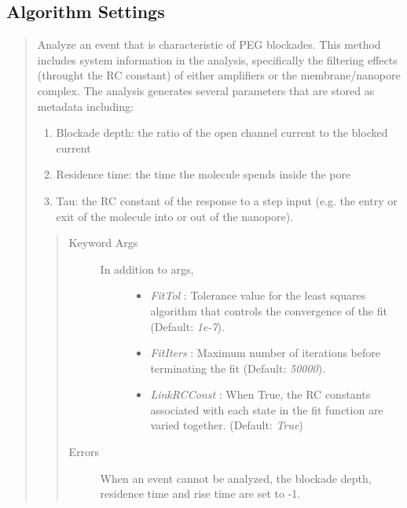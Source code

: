 \documentclass[letterpaper,10pt,english]{sphinxmanual}
\begin{document}
\subsection{Algorithm Settings}
\label{doc/Algorithms:algorithm-settings}\begin{quote}

Analyze an event that is characteristic of PEG blockades. This method includes system
information in the analysis, specifically the filtering effects (throught the RC constant)
of either amplifiers or the membrane/nanopore complex. The analysis generates several
parameters that are stored as metadata including:
\begin{enumerate}
\item {} 
Blockade depth: the ratio of the open channel current to the blocked current

\item {} 
Residence time: the time the molecule spends inside the pore

\item {} 
Tau: the RC constant of the response to a step input (e.g. the entry or exit of the molecule into or out of the nanopore).

\end{enumerate}
\begin{quote}\begin{description}
\item[{Keyword Args}] \leavevmode\begin{description}
\item[{In addition to {\hyperref[api\string-doc/mosaic.meta:mosaic.metaEventProcessor.metaEventProcessor]{\emph{}}} args,}] \leavevmode\begin{itemize}
\item {} 
\emph{FitTol} :            Tolerance value for the least squares algorithm that controls the convergence of the fit (Default: \emph{1e-7}).

\item {} 
\emph{FitIters} :          Maximum number of iterations before terminating the fit (Default: \emph{50000}).

\item {} 
\emph{LinkRCConst} :       When True, the RC constants associated with each state in the fit function are varied together. (Default: \emph{True})

\end{itemize}

\end{description}

\item[{Errors}] \leavevmode
When an event cannot be analyzed, the blockade depth, residence time and rise time are set to -1.

\end{description}\end{quote}
\end{quote}
\end{document}
